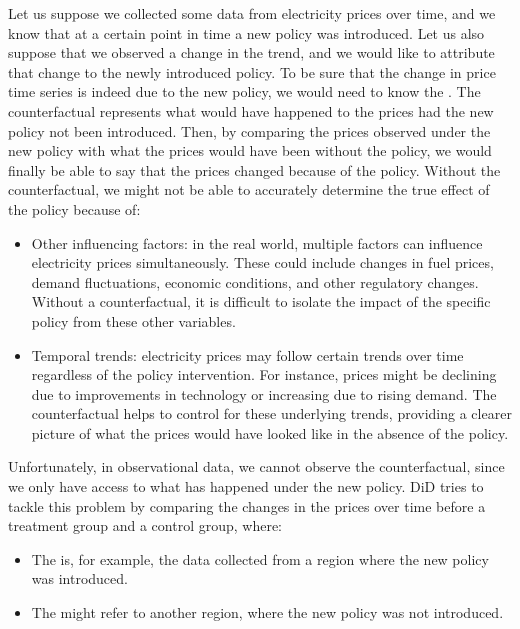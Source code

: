 \documentclass[letterpaper,10pt,english]{jupyterBook}
\begin{document}
\sphinxAtStartPar
Let us suppose we collected some data from electricity prices over time, and we know that at a certain point in time a new policy was introduced. Let us also suppose that we observed a change in the trend, and we would like to attribute that change to the newly introduced policy. To be sure that the change in price time series is indeed due to the new policy, we would need to know the . The counterfactual represents what would have happened to the prices had the new policy not been introduced. Then, by comparing the prices observed under the new policy with what the prices would have been without the policy, we would finally be able to say that the prices changed because of the policy. Without the counterfactual, we might not be able to accurately determine the true effect of the policy because of:
\begin{itemize}
\item {} 
\sphinxAtStartPar
Other influencing factors: in the real world, multiple factors can influence electricity prices simultaneously. These could include changes in fuel prices, demand fluctuations, economic conditions, and other regulatory changes. Without a counterfactual, it is difficult to isolate the impact of the specific policy from these other variables.

\item {} 
\sphinxAtStartPar
Temporal trends: electricity prices may follow certain trends over time regardless of the policy intervention. For instance, prices might be declining due to improvements in technology or increasing due to rising demand. The counterfactual helps to control for these underlying trends, providing a clearer picture of what the prices would have looked like in the absence of the policy.

\end{itemize}

\sphinxAtStartPar
Unfortunately, in observational data, we cannot observe the counterfactual, since we only have access to what has happened under the new policy. DiD tries to tackle this problem by comparing the changes in the prices over time before a treatment group and a control group, where:
\begin{itemize}
\item {} 
\sphinxAtStartPar
The  is, for example, the data collected from a region where the new policy was introduced.

\item {} 
\sphinxAtStartPar
The  might refer to another region, where the new policy was not introduced.

\end{itemize}
\end{document}
